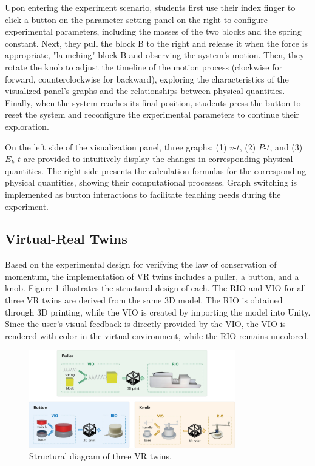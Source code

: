 \documentclass[sigconf,review,anonymous]{acmart}
\begin{document}
Upon entering the experiment scenario, students first use their index finger to click a button on the parameter setting panel on the right to configure experimental parameters, including the masses of the two blocks and the spring constant. Next, they pull the block B to the right and release it when the force is appropriate, "launching" block B and observing the system's motion. Then, they rotate the knob to adjust the timeline of the motion process (clockwise for forward, counterclockwise for backward), exploring the characteristics of the visualized panel's graphs and the relationships between physical quantities. Finally, when the system reaches its final position, students press the button to reset the system and reconfigure the experimental parameters to continue their exploration.

On the left side of the visualization panel, three graphs: (1) $v$-$t$, (2) $P$-$t$, and (3) $E_k$-$t$ are provided to intuitively display the changes in corresponding physical quantities. The right side presents the calculation formulas for the corresponding physical quantities, showing their computational processes. Graph switching is implemented as button interactions to facilitate teaching needs during the experiment.

\subsection{Virtual-Real Twins}
Based on the experimental design for verifying the law of conservation of momentum, the implementation of VR twins includes a puller, a button, and a knob. Figure \ref{fig:structural-diagram} illustrates the structural design of each. The RIO and VIO for all three VR twins are derived from the same 3D model. The RIO is obtained through 3D printing, while the VIO is created by importing the model into Unity. Since the user's visual feedback is directly provided by the VIO, the VIO is rendered with color in the virtual environment, while the RIO remains uncolored.

\begin{figure}[t]
  \centering
  \includegraphics[width=0.8\textwidth]{image/Structural-Diagram.pdf} %
  \caption{Structural diagram of three VR twins.}
  \label{fig:structural-diagram}
\end{figure}
\end{document}
